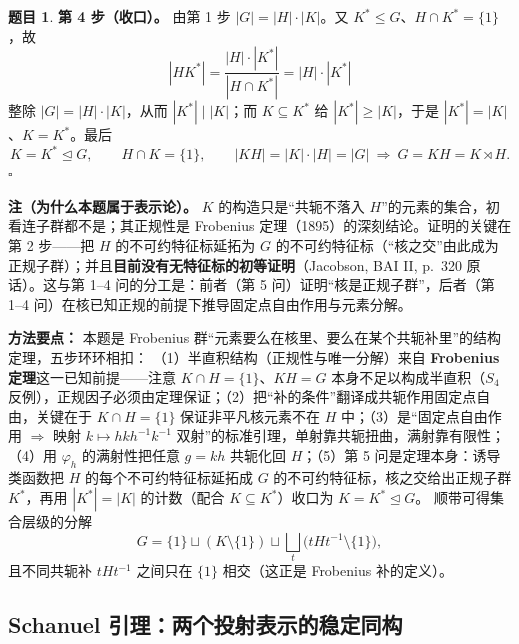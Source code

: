 \documentclass[a4paper]{ctexart}
\theoremstyle{definition}
\newtheorem{example}{题目}[section]
\theoremstyle{analysis}
\theoremstyle{plain}
\begin{document}
\begin{example}
\textbf{第 4 步（收口）。} 由第 1 步 \(|G|=|H|\cdot|K|\)。又 \(K^*\le G\)、\(H\cap K^*=\{1\}\)，故
\[
  |HK^*|=\frac{|H|\cdot|K^*|}{|H\cap K^*|}=|H|\cdot|K^*|
\]
整除 \(|G|=|H|\cdot|K|\)，从而 \(|K^*|\mid|K|\)；而 \(K\subseteq K^*\) 给 \(|K^*|\ge|K|\)，于是 \(|K^*|=|K|\)、\(K=K^*\)。最后
\[
  K=K^*\trianglelefteq G,\qquad
  H\cap K=\{1\},\qquad
  |KH|=|K|\cdot|H|=|G|\ \Longrightarrow\ G=KH=K\rtimes H.
\]
\(\square\)

\textbf{注（为什么本题属于表示论）。} \(K\) 的构造只是“共轭不落入 \(H\)”的元素的集合，初看连子群都不是；其正规性是 Frobenius 定理（1895）的深刻结论。证明的关键在第 2 步——把 \(H\) 的不可约特征标延拓为 \(G\) 的不可约特征标（“核之交”由此成为正规子群）；并且\textbf{目前没有无特征标的初等证明}（Jacobson, BAI II, p.~320 原话）。这与第 1--4 问的分工是：前者（第 5 问）证明“核是正规子群”，后者（第 1--4 问）在核已知正规的前提下推导固定点自由作用与元素分解。

\textbf{方法要点：}
本题是 Frobenius 群“元素要么在核里、要么在某个共轭补里”的结构定理，五步环环相扣：
（1）半直积结构（正规性与唯一分解）来自 \textbf{Frobenius 定理}这一已知前提——注意 \(K\cap H=\{1\}\)、\(KH=G\) 本身不足以构成半直积（\(S_4\) 反例），正规因子必须由定理保证；（2）把“补的条件”翻译成共轭作用固定点自由，关键在于 \(K\cap H=\{1\}\) 保证非平凡核元素不在 \(H\) 中；（3）是“固定点自由作用 \(\Longrightarrow\) 映射 \(k\mapsto hkh^{-1}k^{-1}\) 双射”的标准引理，单射靠共轭扭曲，满射靠有限性；（4）用 \(\varphi_h\) 的满射性把任意 \(g=kh\) 共轭化回 \(H\)；（5）第 5 问是定理本身：诱导类函数把 \(H\) 的每个不可约特征标延拓成 \(G\) 的不可约特征标，核之交给出正规子群 \(K^*\)，再用 \(|K^*|=|K|\) 的计数（配合 \(K\subseteq K^*\)）收口为 \(K=K^*\trianglelefteq G\)。
顺带可得集合层级的分解
\[
  G=\{1\}\sqcup (K\setminus\{1\})\sqcup \bigsqcup_{t}\bigl(tHt^{-1}\setminus\{1\}\bigr),
\]
且不同共轭补 \(tHt^{-1}\) 之间只在 \(\{1\}\) 相交（这正是 Frobenius 补的定义）。
\end{example}

\subsection{Schanuel 引理：两个投射表示的稳定同构}\label{subsec:problem-schanuel-lemma}
\end{document}
